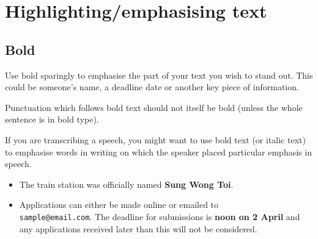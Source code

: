 \documentclass[11pt,a4paper]{book}
\newcommand{\cmark}{{\color{green(html/cssgreen)}\checkmark}}%
\begin{document}
	\chapter{Highlighting/emphasising text}
		\section{Bold}
		Use bold sparingly to emphasise the part of your text you wish to stand out. This could be someone's name, a deadline date or another key piece of information.\par
		Punctuation which follows bold text should not itself be bold (unless the whole sentence is in bold type).\par
		If you are transcribing a speech, you might want to use bold text (or italic text) to emphasise words in writing on which the speaker placed particular emphasis in speech.
		{\firasans \begin{mdframed}[backgroundcolor=aliceblue] \begin{itemize}[label=\cmark]
			\item The train station was officially named \textbf{Sung Wong Toi}.
			\item Applications can either be made online or emailed to\\ \texttt{sample@email.com}. The deadline for submissions is \textbf{noon on 2 April} and any applications received later than this will not be considered.
		\end{itemize} \end{mdframed} }
\end{document}
